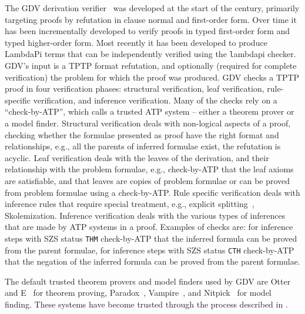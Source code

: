 \documentclass[runningheads]{llncs}
\newcommand{\smalltt}[1]{\small \texttt{#1}}
\begin{document}
The GDV derivation verifier~\cite{Sut06} was developed at the start of the century, primarily
targeting proofs by refutation in clause normal and first-order form.
Over time it has been incrementally developed to verify proofs in typed first-order form and
typed higher-order form.
Most recently it has been developed to produce LambdaPi 
terms that can be independently verified using the {\smalltt lambdapi} checker.~\cite{SBB25}
GDV's input is a TPTP format refutation, and optionally (required for complete verification) the 
problem for which the proof was produced.
GDV checks a TPTP proof in four verification phases: structural verification, leaf verification,
rule-specific verification, and inference verification.
Many of the checks rely on a ``check-by-ATP'', which calls a trusted ATP system -- either a theorem 
prover or a model finder.
Structural verification deals with non-logical aspects of a proof, checking whether the
formulae presented as proof have the right format and relationships, e.g., all the parents of 
inferred formulae exist, the refutation is acyclic. 
Leaf verification deals with the leaves of the derivation, and their relationship with
the problem formulae, e.g., check-by-ATP that the leaf axioms are satisfiable, and that leaves 
are copies of problem formulae or can be proved from problem formulae using a check-by-ATP.
Rule specific verification deals with inference rules that require special treatment, e.g.,
explicit splitting~\cite{Wei01}, Skolemization. 
Inference verification deals with the various types of inferences that are made by ATP
systems in a proof.
Examples of checks are: for inference steps with SZS status {\smalltt{THM}} check-by-ATP that the 
inferred formula can be proved from the parent formulae, for inference steps with SZS status 
{\smalltt{CTH}} check-by-ATP that the negation of the inferred formula can be proved from the 
parent formulae.


The default trusted theorem provers and model finders used by GDV are Otter~\cite{McC03-Otter}
and E~\cite{SCV19} for theorem proving, Paradox~\cite{CS18}, Vampire~\cite{KV13}, and
Nitpick~\cite{BN10-ITP} for model finding.
These systems have become trusted through the process described in \cite{SBB25}.
\end{document}
